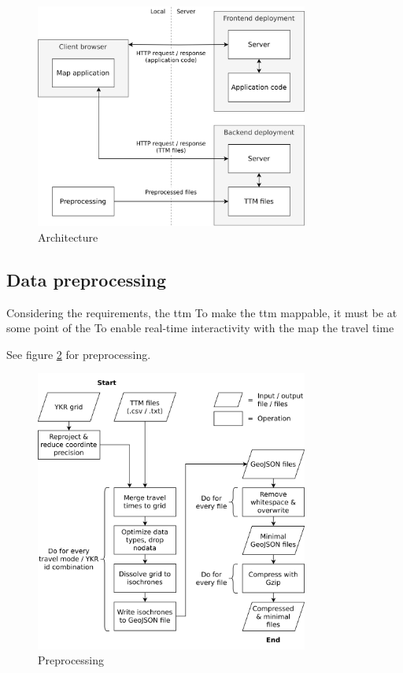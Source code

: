 \begin{figure}[H]
	\centering
	\includegraphics[width=0.8\textwidth]{visual/figures/diagrams/architechture.png}
	\caption{Architecture}
	\label{fig:architechture}
\end{figure}

\subsection{Data preprocessing}
Considering the requirements, the \acrshort{ttm}
To make the \acrshort{ttm} mappable, it must be at some point of the
To enable real-time interactivity with the map the travel time





See figure \ref{fig:preprocessing} for preprocessing.

\begin{figure}[H]
	\centering
	\includegraphics[width=0.8\textwidth]{visual/figures/diagrams/preprocessing.png}
	\caption{Preprocessing}
	\label{fig:preprocessing}
\end{figure}

